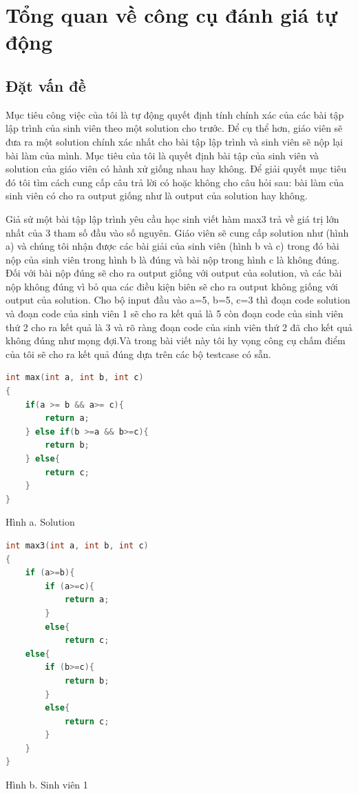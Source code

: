 \documentclass[12pt,a4paper]{article}
\begin{document}
\section{Tổng quan về công cụ đánh giá tự động}

\subsection{Đặt vấn đề}

Mục tiêu công việc của tôi là tự động quyết định tính chính xác của các bài tập lập trình của sinh viên theo một solution cho trước. Để cụ thể hơn, giáo viên sẽ đưa ra một solution chính xác nhất cho bài tập lập trình và sinh viên sẽ nộp lại bài làm của mình. Mục tiêu của tôi là quyết định bài tập của sinh viên và solution của giáo viên có hành xử giống nhau hay không. Để giải quyết mục tiêu đó tôi tìm cách cung cấp câu trả lời có hoặc không cho câu hỏi sau: bài làm của sinh viên có cho ra output giống như là output của solution hay không.

Giả sử một bài tập lập trình yêu cầu học sinh viết hàm max3 trả về giá trị lớn nhất của 3 tham số đầu vào số nguyên. Giáo viên sẽ cung cấp solution như (hình a) và chúng tôi nhận được các bài giải của sinh viên (hình b và c) trong đó bài nộp của sinh viên trong hình b là đúng và bài nộp trong hình c là không đúng. Đối với bài nộp đúng sẽ cho ra output giống với output của solution, và các bài nộp không đúng vì bỏ qua các điều kiện biên sẽ cho ra output không giống với output của solution. Cho bộ input đầu vào 
a=5, b=5, c=3 thì đoạn code solution và đoạn code của sinh viên 1 sẽ cho ra kết quả là 5 còn đoạn code của sinh viên thứ 2 cho ra kết quả là 3 và rõ ràng đoạn code của sinh viên thứ 2 đã cho kết quả không đúng như mọng đợi.Và trong bài viết này tôi hy vọng công cụ chấm điểm của tôi sẽ cho ra kết quả đúng dựa trên các bộ testcase có sẵn.

\begin{lstlisting}[language=c]
int max(int a, int b, int c) 
{
    if(a >= b && a>= c){
        return a;
    } else if(b >=a && b>=c){
        return b;
    } else{
        return c;
    }
}
\end{lstlisting}
\caption{Hình a. Solution}

\begin{lstlisting}[language=c]
int max3(int a, int b, int c) 
{ 
    if (a>=b){
        if (a>=c){
            return a;
        }
        else{
            return c;
    else{
        if (b>=c){
            return b;
        }
        else{
            return c; 
        }
    }
}
\end{lstlisting}
\caption{Hình b. Sinh viên 1}
\end{document}
